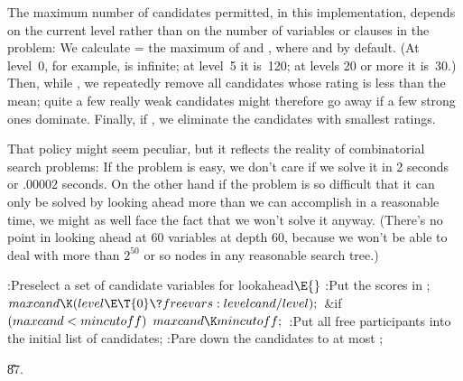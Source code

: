 The maximum number of candidates permitted, in this
implementation,
depends on the current level rather than on the number of variables
or clauses in the problem: We calculate  = the maximum
of  and , where  and
 by default. (At level~0, for example,  is
infinite; at level~5 it is~120; at levels 20 or more it is~30.)
Then, while , we repeatedly remove all
candidates whose
rating is less than the mean; quite a few really weak candidates might
therefore go away if a few strong ones dominate. Finally, if
, we eliminate the 
candidates with smallest ratings.

That policy might seem peculiar, but it reflects the reality of
combinatorial search problems: If the problem is easy, we don't
care if we solve it in 2 seconds or .00002 seconds. On the other hand
if the problem is so difficult that it can only be solved
by looking ahead more than we can accomplish in a reasonable time,
we might as well face the fact that we won't solve it anyway.
(There's no point in looking ahead at 60 variables at depth 60,
because we won't be able to deal with more than $2^{50}$ or so
nodes in any reasonable search tree.)

\Y\B\4:Preselect a set of candidate variables for lookahead\X${}\E{}$\6
:Put the scores in \X;\6
${}\\{maxcand}\K(\\{level}\E\T{0}\?\\{freevars}:\\{levelcand}/\\{level});{}$\6
\&{if} ${}(\\{maxcand}<\\{mincutoff}){}$\1\5
${}\\{maxcand}\K\\{mincutoff};{}$\2\6
:Put all free participants into the initial list of candidates\X;\6
:Pare down the candidates to at most \X;\par
\U87.\fi

